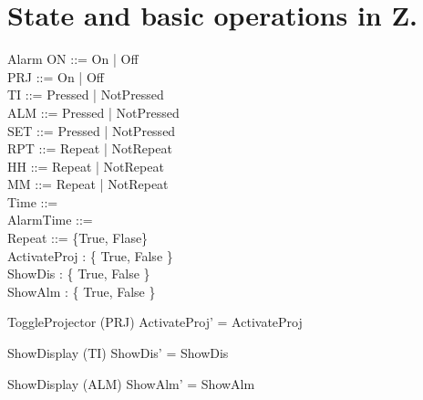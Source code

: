 \documentclass[Main_Assignment2]{subfiles}
\begin{document}
\section{State and basic operations in Z.}



\begin{schema}{Alarm}
ON ::= On | Off  \\
PRJ ::= On | Off \\
TI ::= Pressed | NotPressed \\
ALM ::= Pressed | NotPressed \\
SET ::= Pressed | NotPressed \\
RPT ::= Repeat | NotRepeat \\
HH ::= Repeat | NotRepeat \\
MM ::= Repeat | NotRepeat \\
Time ::=  \\
AlarmTime ::=  \\
Repeat ::= \{True, Flase\} \\
ActivateProj : \{ True, False \} \\
ShowDis : \{ True, False \} \\
ShowAlm : \{ True, False \}
\end{schema}




\begin{schema}{ToggleProjector} %
\Delta (PRJ) 
\where
ActivateProj' = ActivateProj 
\end{schema}


\begin{schema}{ShowDisplay} %
\Delta (TI)
\where
ShowDis' = ShowDis 
\end{schema}


\begin{schema}{ShowDisplay} %
\Delta (ALM)
\where
ShowAlm' = ShowAlm 
\end{schema}
\end{document}
